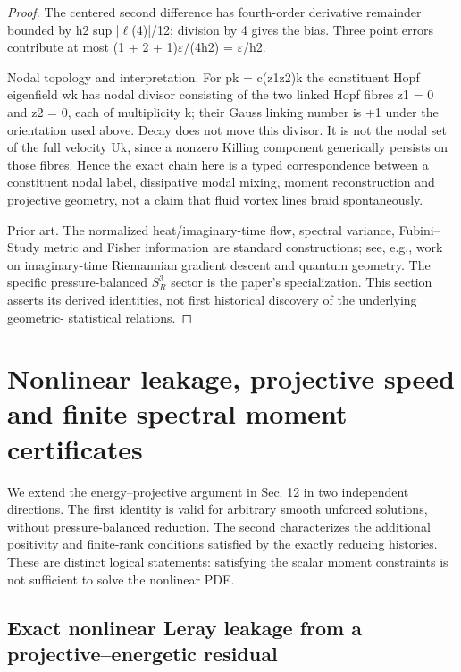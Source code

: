 \documentclass[10pt,letterpaper]{article}
\theoremstyle{remark}
\begin{document}
\begin{proof}
The centered second difference has fourth-order derivative remainder bounded by h2 sup |\(\ell \)(4)|/12; division by 4 gives the bias. Three point errors contribute at most (1 + 2 + 1)\(\varepsilon \)/(4h2) = \(\varepsilon \)/h2.

Nodal topology and interpretation. For pk = c(z1z2)k the constituent Hopf eigenfield wk has nodal divisor consisting of the two linked Hopf fibres z1 = 0 and z2 = 0, each of multiplicity k; their Gauss linking number is +1 under the orientation used above. Decay does not move this divisor. It is not the nodal set of the full velocity Uk, since a nonzero Killing component generically persists on those fibres. Hence the exact chain here is a typed correspondence between a constituent nodal label, dissipative modal mixing, moment reconstruction and projective geometry, not a claim that fluid vortex lines braid spontaneously.


Prior art. The normalized heat/imaginary-time flow, spectral variance, Fubini–Study metric and Fisher information are standard constructions; see, e.g., work on imaginary-time Riemannian gradient descent and quantum geometry. The specific pressure-balanced \(S_R^3\) sector is the paper’s specialization. This section asserts its derived identities, not first historical discovery of the underlying geometric- statistical relations.


\end{proof}

\section{Nonlinear leakage, projective speed and finite spectral moment certificates}


We extend the energy–projective argument in Sec. 12 in two independent directions. The first identity is valid for arbitrary smooth unforced solutions, without pressure-balanced reduction. The second characterizes the additional positivity and finite-rank conditions satisfied by the exactly reducing histories. These are distinct logical statements: satisfying the scalar moment constraints is not sufficient to solve the nonlinear PDE.


\subsection{Exact nonlinear Leray leakage from a projective–energetic residual}
\end{document}
